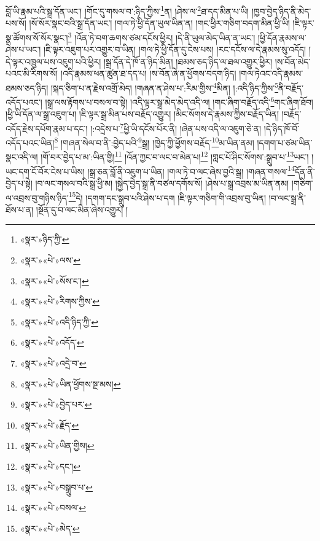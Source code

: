 བློ་ཡི་རྣམ་པའི་སྒྲ་དོན་ཡང་། །གོང་དུ་གསལ་བ་:ཉིད་ཀྱིས་\footnote{«སྣར་»ཉིད་ཀྱི་}ན། །ཤེས་ལ་\footnote{«སྣར་»«པེ་»ལས་}ཐ་དད་མིན་པ་ཡི། །ཁྱབ་བྱེད་ཉིད་ནི་མེད་པས་སོ། །སོ་སོར་སྣང་བའི་སྒྲ་དོན་ཡང་། །གལ་ཏེ་ཕྱི་དོན་ཡུལ་ཡིན་ན། །གང་ཕྱིར་གཅིག་བདག་མིན་ཕྱི་ཡི། །ཇི་ལྟར་སྣ་ཚོགས་སོ་སོར་སྣང་།\footnote{«སྣར་»«པེ་»སོས་ང་།} །འོན་ཏེ་བག་ཆགས་ཙམ་དངོས་ཕྱིར། །དེ་ནི་ཡུལ་མེད་ཡིན་ན་ཡང་། །ཕྱི་དོན་རྣམས་ལ་ཤེས་པ་ཡང་། །ཇི་ལྟར་འཇུག་པར་འགྱུར་བ་ཡིན། །གལ་ཏེ་ཕྱི་དོན་དུ་ངེས་པས། །རང་དངོས་ལ་དེ་རྣམས་སུ་འདོད། །དེ་ལྟར་འཁྲུལ་པས་འཇུག་པའི་ཕྱིར། །སྒྲ་དོན་དེ་ཁོ་ན་ཉིད་མིན། །ཐམས་ཅད་ཉིད་ལ་ཐལ་འགྱུར་ཕྱིར། །ས་བོན་མེད་པའང་མི་རིགས་སོ། །འདི་རྣམས་ཕན་ཚུན་ཐ་དད་པ། །ས་བོན་ཞེ་ན་ཕྱོགས་བདག་ཉིད། །གལ་ཏེའང་འདི་རྣམས་ཐམས་ཅད་ཉིད། །སྐད་ཅིག་པ་ན་རྗེས་འགྲོ་མེད། །གཞན་ན་ཤེས་པ་:རིམ་གྱིས་\footnote{«སྣར་»«པེ་»རིགས་ཀྱིས་}མིན། །:འདི་ཉིད་ཀྱིས་\footnote{«སྣར་»«པེ་»འདི་ཉིད་ཀྱི་}ནི་བརྗོད་འདོད་པའང་། །སྒྲ་ལས་རྟོགས་པ་བསལ་བ་སྟེ། །འདི་ལྟར་སྒྲ་མེད་མེད་འདི་ལ། །གང་ཞིག་བརྗོད་འདི་\footnote{«སྣར་»«པེ་»འདོད་}གང་ཞིག་ཐོབ། །ཕྱི་ཡི་དོན་ལ་སྒྲ་འཇུག་པ། །ཇི་ལྟར་སྒྲ་མིན་པས་བརྗོད་འགྱུར། །མིང་སོགས་དེ་རྣམས་ཀྱིས་བརྗོད་ཡིན། །བརྗོད་འདོད་རྗེས་དཔོག་རྣམ་པ་དང་། །:འདྲེས་པ་\footnote{«སྣར་»«པེ་»འདྲེ་བ་}ཕྱི་ཡི་དངོས་པོར་ནི། །ཞེན་པས་འདི་ལ་འཇུག་ཅེ་ན། །དེ་ཉིད་ཁོ་བོ་འདོད་པའང་ཡིན།\footnote{«སྣར་»«པེ་»ཡིན་ཕྱོགས་སྔ་མས།} །གཞན་སེལ་བ་ནི་:བྱེད་པའི་\footnote{«སྣར་»«པེ་»བྱེད་པར་}སྒྲ། །ཁྱེད་ཀྱི་ཕྱོགས་བརྗོད་\footnote{«སྣར་»«པེ་»རྗོད་}མ་ཡིན་ནམ། །དགག་པ་ཙམ་ཡིན་སྣང་འདི་ལ། །གོ་བར་བྱེད་པ་མ་:ཡིན་གྱི།\footnote{«སྣར་»«པེ་»ཡིན་གྱིས།} །འོན་ཀྱང་བ་ལང་བ་མེན་པ།\footnote{«སྣར་»«པེ་»དང་།} །གླང་པོ་ཤིང་སོགས་:སྒྲུབ་པ་\footnote{«སྣར་»«པེ་»བསྒྲུབ་པ་}ཡང་། །ཡང་དག་ངོ་བོར་ངེས་པ་ཡིས། །སྒྲ་ཅན་བློ་ནི་འཇུག་པ་ཡིན། །གལ་ཏེ་བ་ལང་ཞེས་བྱའི་སྒྲ། །གཞན་གསལ་\footnote{«སྣར་»«པེ་»བསལ་}དོན་ནི་བྱེད་པ་སྟེ། །བ་ལང་གསལ་བའི་སྒྲ་ཕྱི་མ། །སྐྱེད་བྱེད་སྒྲ་ནི་བཙལ་དགོས་སོ། །ཤེས་པ་སྒྲ་འབྲས་མ་ཡིན་ནམ། །གཅིག་ལ་འབྲས་བུ་གཉིས་ཉིད་\footnote{«སྣར་»«པེ་»མེད་}དེ། །དགག་དང་སྒྲུབ་པའི་ཤེས་པ་དག །ཇི་ལྟར་གཅིག་གི་འབྲས་བུ་ཡིན། །བ་ལང་སྒྲ་ནི་ཐོས་པ་ན། །སྔོན་དུ་བ་ལང་མིན་ཞེས་འགྱུར། །
